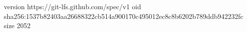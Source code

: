 version https://git-lfs.github.com/spec/v1
oid sha256:1537b82403aa26688322cb514a900170c495012ec8c8b6202b789ddb942232fc
size 2052
